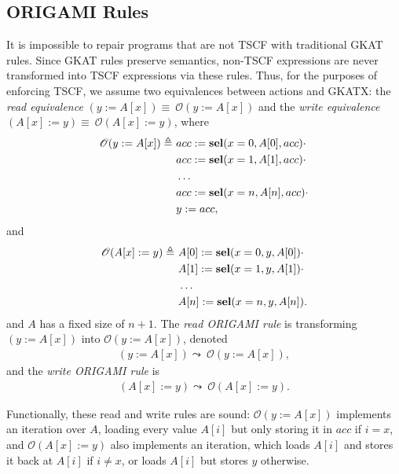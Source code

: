 \subsection{ORIGAMI Rules}
It is impossible to repair programs that are not TSCF with traditional GKAT rules. Since GKAT rules preserve semantics, non-TSCF expressions are never transformed into TSCF expressions via these rules. 
Thus, for the purposes of enforcing TSCF, we assume two equivalences between actions and GKATX: the \emph{read equivalence} $(y:=A[x])\equiv\ \mathscr{O}(y:=A[x])$ and the \emph{write equivalence} $(A[x]:=y)\equiv\ \mathscr{O}(A[x]:=y)$, where 
\begin{align*}
    \mathscr{O}(y:=A[x])\triangleq\  
    &acc:=\textbf{sel}(x=0,A[0],acc)\cdot \\
    &acc:=\textbf{sel}(x=1,A[1],acc)\cdot \\
    &\ldots\\
    &acc:=\textbf{sel}(x=n,A[n],acc)\cdot \\
    &y:=acc,
\end{align*} and 
\begin{align*}
    \mathscr{O}(A[x]:=y)\triangleq\  
    &A[0]:=\textbf{sel}(x=0,y,A[0])\cdot \\
    &A[1]:=\textbf{sel}(x=1,y,A[1])\cdot \\
    &\ldots\\
    &A[n]:=\textbf{sel}(x=n,y,A[n]).
\end{align*}
and $A$ has a fixed size of $n+1$. The \emph{read ORIGAMI rule} is transforming $(y:=A[x])$ into $\mathscr{O}(y:=A[x])$, denoted 
\begin{align}
    (y:=A[x])\leadsto\ \mathscr{O}(y:=A[x]),
\end{align}
and the \emph{write ORIGAMI rule} is 
\begin{align}
    (A[x]:=y)\leadsto\ \mathscr{O}(A[x]:=y).
\end{align}

Functionally, these read and write rules are sound: $\mathscr{O}(y:=A[x])$ implements an iteration over $A$, loading every value $A[i]$ but only storing it in $acc$ if $i=x$, and $\mathscr{O}(A[x]:=y)$ also implements an iteration, which loads $A[i]$ and stores it back at $A[i]$ if $i\neq x$, or loads $A[i]$ but stores $y$ otherwise.

